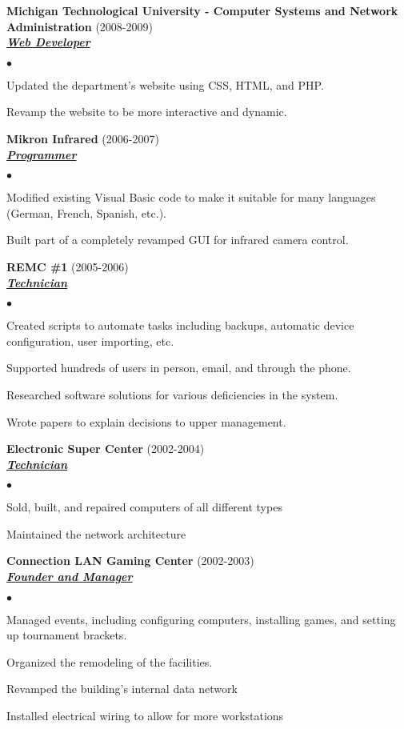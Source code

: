\documentclass{article}
\newcommand{\employer}[3]{{ \textbf{#1} (#2)\\ \underline{\textbf{\emph{#3}}}\\  }}
\newenvironment{achievements}{\begin{list}{$\bullet$}{\topsep 0pt \itemsep -2pt}}{\vspace*{4pt}\end{list}}
\begin{document}
\employer{Michigan Technological University - Computer Systems and Network Administration}{2008-2009}{Web Developer}
\begin{achievements}
	\item Updated the department's website using CSS, HTML, and PHP.
	\item Revamp the website to be more interactive and dynamic.
\end{achievements}

\employer{Mikron Infrared}{2006-2007}{Programmer}
\begin{achievements}
	\item Modified existing Visual Basic code to make it suitable for many languages (German, French, Spanish, etc.).
	\item Built part of a completely revamped GUI for infrared camera control.
\end{achievements}

\employer{REMC \#1}{2005-2006}{Technician}
\begin{achievements}
	\item Created scripts to automate tasks including backups, automatic device configuration, user importing, etc. 
	\item Supported hundreds of users in person, email, and through the phone.
	\item Researched software solutions for various deficiencies in the system.
	\item Wrote papers to explain decisions to upper management.
\end{achievements}

\employer{Electronic Super Center}{2002-2004}{Technician}
\begin{achievements}
	\item Sold, built, and repaired computers of all different types
	\item Maintained the network architecture
\end{achievements}

\employer{Connection LAN Gaming Center}{2002-2003}{Founder and Manager}
\begin{achievements}
	\item Managed events, including configuring computers, installing games, and setting up tournament brackets.
	\item Organized the remodeling of the facilities.
	\item Revamped the building's internal data network
	\item Installed electrical wiring to allow for more workstations
\end{achievements}
\end{document}
